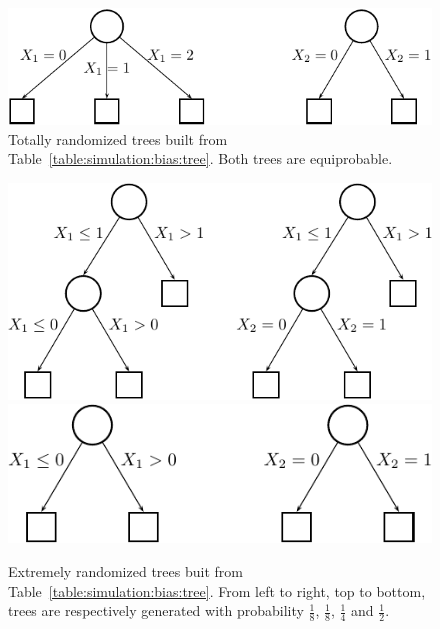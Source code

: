 \begin{figure}
    \centering
    \includegraphics[scale=1.0]{figures/ch7_trees_id3.pdf}
    \caption{Totally randomized trees built from Table~\ref{table:simulation:bias:tree}. Both trees are equiprobable.}
    \label{fig:7:bias:trees:id3}
\end{figure}
\begin{figure}
    \centering
    \includegraphics[scale=1.0]{figures/ch7_trees_ets.pdf}\vspace{1cm}\\
    \includegraphics[scale=1.0]{figures/ch7_trees_ets2.pdf}
    \caption{Extremely randomized trees buit from Table~\ref{table:simulation:bias:tree}. From left to right, top to bottom, trees are respectively generated with probability $\tfrac{1}{8}$, $\tfrac{1}{8}$, $\tfrac{1}{4}$ and $\tfrac{1}{2}$.}
    \label{fig:7:bias:trees:ets}
\end{figure}


%

